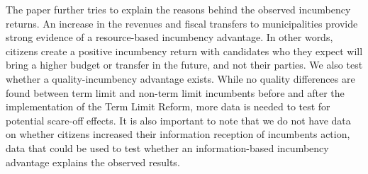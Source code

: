 \documentclass[12pt]{amsart}
\numberwithin{equation}{section}
\theoremstyle{definition}
\theoremstyle{definition}
\theoremstyle{definition}
\begin{document}
The paper further tries to explain the reasons behind the observed incumbency returns. An increase in the revenues and fiscal transfers to municipalities provide strong evidence of a resource-based incumbency advantage. In other words, citizens create a positive incumbency return with candidates who they expect will bring a higher budget or transfer in the future, and not their parties. We also test whether a quality-incumbency advantage exists. While no quality differences are found between term limit and non-term limit incumbents before and after the implementation of the Term Limit Reform, more data is needed to test for potential scare-off effects. It is also important to note that we do not have data on whether citizens increased their information reception of incumbents action, data that could be used to test whether an information-based incumbency advantage explains the observed results.


\clearpage               

 
    
\end{document}
